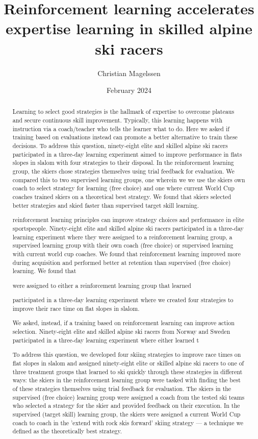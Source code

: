 \documentclass{article}
\title{Reinforcement learning accelerates expertise learning in skilled alpine ski racers}
\author{Christian Magelssen}
\date{February 2024}
\begin{document}
\maketitle


\begin{abstract}
Learning to select good strategies is the hallmark of expertise to overcome plateaus and secure continuous skill improvement. Typically, this learning happens with instruction via a coach/teacher who tells the learner what to do. Here we asked if training based on evaluations instead can promote a better alternative to train these decisions. To address this question, ninety-eight elite and skilled alpine ski racers participated in a three-day learning experiment aimed to improve performance in flats slopes in slalom with four strategies to their disposal. In the reinforcement learning group, the skiers chose strategies themselves using trial feedback for evaluation. We compared this to two supervised learning groups, one wherein we we use the skiers own coach to select strategy for learning (free choice) and one where current World Cup coaches trained skiers on a theoretical best strategy. We found that skiers selected better strategies and skied faster than supervised target skill learning.



reinforcement learning principles can improve strategy choices and performance in elite sportspeople. Ninety-eight elite and skilled alpine ski racers participated in a three-day learning experiment where they were assigned to a reinforcement learning group, a supervised learning group with their own coach (free choice) or supervised learning with current world cup coaches. We found that reinforcement learning improved more during acquisition and performed better at retention than supervised (free choice) learning. We found that 


were assigned to either a reinforcement learning group that learned 


participated in a three-day learning experiment where we created four strategies to improve their race time on flat slopes in slalom. 


We asked, instead, if a training based on reinforcement learning can improve action selection. Ninety-eight elite and skilled alpine ski racers from Norway and Sweden participated in a three-day learning experiment where either learned t

 To address this question, we developed four skiing strategies to improve race times on flat slopes in slalom and assigned ninety-eight elite or skilled alpine ski racers to one of three treatment groups that learned to ski quickly through these strategies in different ways: the skiers in the reinforcement learning group were tasked with finding the best of these strategies themselves using trial feedback for evaluation. The skiers in the supervised (free choice) learning group were assigned a coach from the tested ski teams who selected a strategy for the skier and provided feedback on their execution. In the supervised (target skill) learning group, the skiers were assigned a current World Cup coach to coach in the 'extend with rock skis forward' skiing strategy — a technique we defined as the theoretically best strategy.


\end{abstract}
\end{document}
